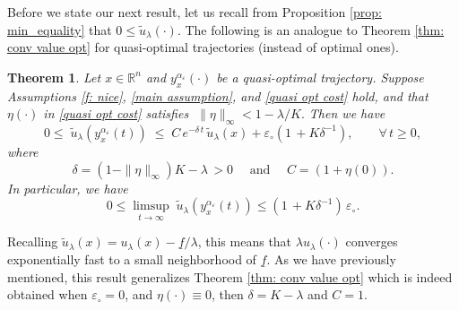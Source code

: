 \documentclass[12pt]{amsart}
\numberwithin{equation}{section}
\theoremstyle{plain}
\newtheorem{theorem}{Theorem}[section]
\begin{document}
Before we state our next result, let us recall from Proposition \ref{prop: min_equality} that $0\leq \tilde{u}_{\lambda}(\cdot)$. The following is an analogue to Theorem \ref{thm: conv value opt} for quasi-optimal trajectories (instead of optimal ones).

\begin{theorem}\label{thm: conv value quasiopt}
Let $x\in \mathbb{R}^{n}$ and $y_{x}^{\alpha_{\varepsilon}}(\cdot)$ be a quasi-optimal trajectory. 
Suppose Assumptions \ref{f: nice}, \ref{main assumption}, and \ref{quasi opt cost} hold, and that $\eta(\cdot)$ in \ref{quasi opt cost} satisfies $\;\|\eta\|_{\infty} < 1- \lambda/K.$ 
Then we have
\begin{equation*}
    0\leq\;\tilde{u}_{\lambda}(y_{x}^{\alpha_{\varepsilon}}(t)) \;\leq\; C\, e^{-\delta\, t}\,\tilde{u}_{\lambda}(x) + \varepsilon_{\circ} \left(1\,+K\delta^{-1}\right),\quad\quad \forall\,t\geq0,
\end{equation*}
where  
\begin{equation*}
    \delta = (1-\|\eta\|_{\infty})K - \lambda\,>0 \quad \text{ and } \quad C=(1+\eta(0)).
\end{equation*}
In particular, we have
\begin{equation*}
    0\leq \limsup\limits_{t\to \infty} \; \tilde{u}_{\lambda}(y_{x}^{\alpha_{\varepsilon}}(t)) \leq \left(1\,+K\delta^{-1}\right)\,\varepsilon_{\circ}.
\end{equation*}
\end{theorem}

Recalling  $\tilde{u}_{\lambda}(x) = u_{\lambda}(x) - \underline{f}/\lambda$, this means that $\lambda u_{\lambda}(\cdot)$ converges exponentially fast to a small neighborhood of $\underline{f}$. 
As we have previously mentioned, this result generalizes Theorem \ref{thm: conv value opt} which is indeed obtained when $\varepsilon_{\circ}=0$, and $\eta(\cdot)\equiv 0$, then $\delta = K-\lambda$ and $C=1$.
\end{document}
